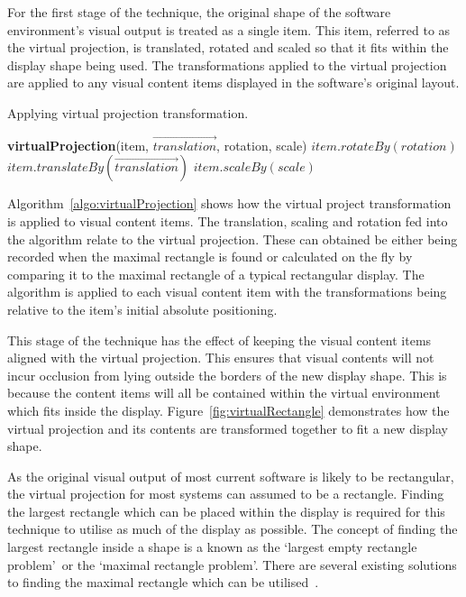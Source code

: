 \documentclass[review,5p,times,twocolumn]{elsarticle}
\newcommand{\INDSTATE}[1][1]{\STATE\hspace{#1\algorithmicindent}}
\begin{document}
For the first stage of the technique, the original shape of the software environment's visual output is treated as a single item.
This item, referred to as the virtual projection, is translated, rotated and scaled so that it fits within the display shape being used.
The transformations applied to the virtual projection are applied to any visual content items displayed in the software's original layout.

\begin{algorithm}[h]
\caption{Applying virtual projection transformation.}
\label{algo:virtualProjection}
\begin{algorithmic}
\STATE \textbf{virtualProjection}(item, $\overrightarrow{translation}$, rotation, scale)
\INDSTATE[2]$item.rotateBy(rotation)$
\INDSTATE[2]$item.translateBy(\overrightarrow{translation})$
\INDSTATE[2]$item.scaleBy(scale)$
\end{algorithmic}
\end{algorithm}

Algorithm~\ref{algo:virtualProjection} shows how the virtual project transformation is applied to visual content items.
The translation, scaling and rotation fed into the algorithm relate to the virtual projection.
These can obtained be either being recorded when the maximal rectangle is found or calculated on the fly by comparing it to the maximal rectangle of a typical rectangular display.
The algorithm is applied to each visual content item with the transformations being relative to the item's initial absolute positioning.

This stage of the technique has the effect of keeping the visual content items aligned with the virtual projection.
This ensures that visual contents will not incur occlusion from lying outside the borders of the new display shape.
This is because the content items will all be contained within the virtual environment which fits inside the display.
Figure~\ref{fig:virtualRectangle} demonstrates how the virtual projection and its contents are transformed together to fit a new display shape.

As the original visual output of most current software is likely to be rectangular, the virtual projection for most systems can assumed to be a rectangle.
Finding the largest rectangle which can be placed within the display is required for this technique to utilise as much of the display as possible.
The concept of finding the largest rectangle inside a shape is a known as the \lq largest empty rectangle problem\rq\ or the \lq maximal rectangle problem\rq .
There are several existing solutions to finding the maximal rectangle which can be utilised~\cite{Aggarwal1987,Naamad1984}.
\end{document}
